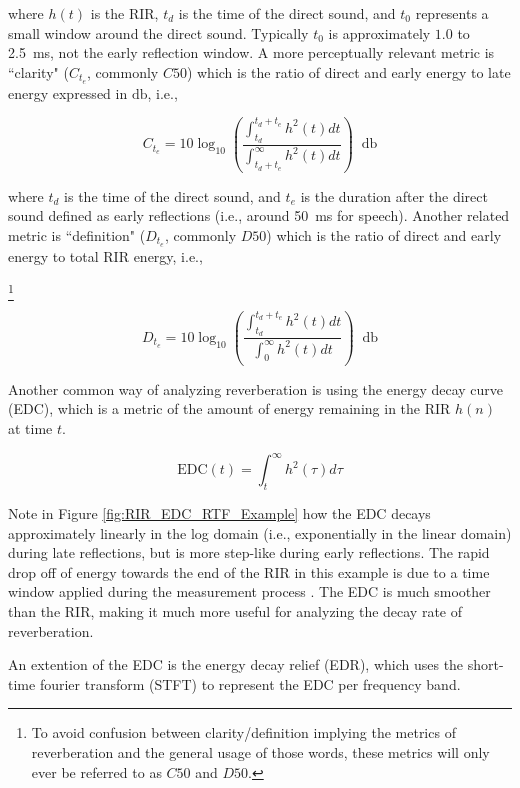 \noindent
where $h(t)$ is the RIR, $t_d$ is the time of the direct sound, and $t_0$ represents a small window around the direct sound. Typically $t_0$ is approximately $1.0$ to \qty{2.5}{\milli\second}, not the early reflection window. A more perceptually relevant metric is ``clarity" ($C_{t_e}$, commonly $C50$) which is the ratio of direct and early energy to late energy expressed in $\unit{\decibel}$, i.e.,

\begin{equation}
	C_{t_e} = 10\log_{10}\left(\frac{\int_{t_d}^{t_d+t_e}h^2(t)dt}{\int_{t_d+t_e}^{\infty}h^2(t)dt}\right)\;\;\unit{\decibel}
\end{equation}

\noindent
where $t_d$ is the time of the direct sound, and $t_e$ is the duration after the direct sound defined as early reflections (i.e., around \qty{50}{\milli\second} for speech). Another related metric is ``definition" ($D_{t_e}$, commonly $D50$) which is the ratio of direct and early energy to total RIR energy, i.e.,

\footnote{To avoid confusion between clarity/definition implying the metrics of reverberation and the general usage of those words, these metrics will only ever be referred to as $C50$ and $D50$.}

\begin{equation}
	D_{t_e} = 10\log_{10}\left(\frac{\int_{t_d}^{t_d+t_e}h^2(t)dt}{\int_{0}^{\infty}h^2(t)dt}\right)\;\;\unit{\decibel}
\end{equation}

Another common way of analyzing reverberation is using the energy decay curve (EDC), which is a metric of the amount of energy remaining in the RIR $h(n)$ at time $t$.

\begin{equation}
	\mathrm{EDC}(t)=\int_{t}^{\infty}h^2(\tau)d\tau \label{eq:edc}
\end{equation}

Note in Figure \ref{fig:RIR_EDC_RTF_Example} how the EDC decays approximately linearly in the log domain (i.e., exponentially in the linear domain) during late reflections, but is more step-like during early reflections.  The rapid drop off of energy towards the end of the RIR in this example is due to a time window applied during the measurement process \citep{kayser2009database}. The EDC is much smoother than the RIR, making it much more useful for analyzing the decay rate of reverberation.

An extention of the EDC is the energy decay relief (EDR), which uses the short-time fourier transform (STFT) to represent the EDC per frequency band.

